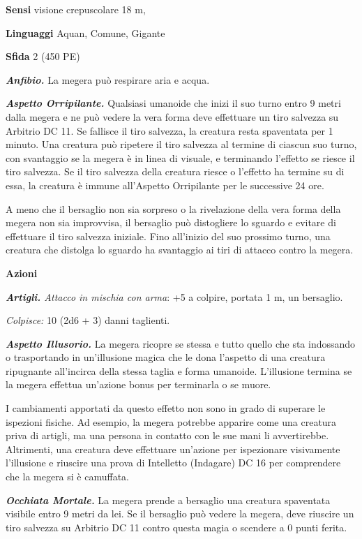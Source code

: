 \begin{multicols}{2}
\textbf{Sensi} visione crepuscolare 18 m, 

\textbf{Linguaggi} Aquan, Comune, Gigante

\textbf{Sfida} 2 (450 PE)\smallskip

\emph{\textbf{Anfibio.}} La megera può respirare aria e acqua.

\emph{\textbf{Aspetto Orripilante.}} Qualsiasi umanoide che inizi il suo
turno entro 9 metri dalla megera e ne può vedere la vera forma deve
effettuare un tiro salvezza su Arbitrio DC 11. Se fallisce il tiro
salvezza, la creatura resta spaventata per 1 minuto. Una creatura può
ripetere il tiro salvezza al termine di ciascun suo turno, con
svantaggio se la megera è in linea di visuale, e terminando l'effetto se
riesce il tiro salvezza. Se il tiro salvezza della creatura riesce o
l'effetto ha termine su di essa, la creatura è immune all'Aspetto
Orripilante per le successive 24 ore.

A meno che il bersaglio non sia sorpreso o la rivelazione della vera
forma della megera non sia improvvisa, il bersaglio può distogliere lo
sguardo e evitare di effettuare il tiro salvezza iniziale. Fino
all'inizio del suo prossimo turno, una creatura che distolga lo sguardo
ha svantaggio ai tiri di attacco contro la megera.

\smallskip\textbf{Azioni}

\emph{\textbf{Artigli.} Attacco in mischia con arma}: +5 a colpire,
portata 1 m, un bersaglio.

\emph{Colpisce:} 10 (2d6 + 3) danni taglienti.

\emph{\textbf{Aspetto Illusorio.}} La megera ricopre se stessa e tutto
quello che sta indossando o trasportando in un'illusione magica che le
dona l'aspetto di una creatura ripugnante all'incirca della stessa
taglia e forma umanoide. L'illusione termina se la megera effettua
un'azione bonus per terminarla o se muore.

I cambiamenti apportati da questo effetto non sono in grado di superare
le ispezioni fisiche. Ad esempio, la megera potrebbe apparire come una
creatura priva di artigli, ma una persona in contatto con le sue mani li
avvertirebbe. Altrimenti, una creatura deve effettuare un'azione per
ispezionare visivamente l'illusione e riuscire una prova di Intelletto
(Indagare) DC 16 per comprendere che la megera si è camuffata.

\emph{\textbf{Occhiata Mortale.}} La megera prende a bersaglio una
creatura spaventata visibile entro 9 metri da lei. Se il bersaglio può
vedere la megera, deve riuscire un tiro salvezza su Arbitrio DC 11
contro questa magia o scendere a 0 punti ferita.


\end{multicols}
